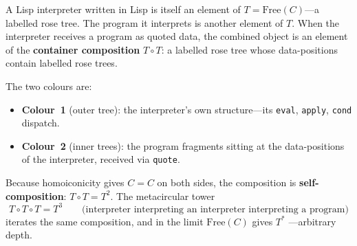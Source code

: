 \documentclass[11pt,a4paper]{article}
\theoremstyle{definition}
\theoremstyle{plain}
\newcommand{\Free}{\mathrm{Free}}
\begin{document}
A Lisp interpreter written in Lisp is itself an element of
$T = \Free(C)$---a labelled rose tree. The program it interprets is
another element of $T$. When the interpreter receives a program as
quoted data, the combined object is an element of the
\textbf{container composition} $T \circ T$: a labelled rose tree
whose data-positions contain labelled rose trees.

The two colours are:
\begin{itemize}[nosep]
\item \textbf{Colour~1} (outer tree): the interpreter's own
  structure---its \texttt{eval}, \texttt{apply}, \texttt{cond}
  dispatch.
\item \textbf{Colour~2} (inner trees): the program fragments sitting
  at the data-positions of the interpreter, received via \texttt{quote}.
\end{itemize}

\begin{center}
\end{center}

Because homoiconicity gives $C = C$ on both sides, the composition is
\textbf{self-composition}: $T \circ T = T^2$. The metacircular tower
\[
T \circ T \circ T = T^3
\qquad\text{(interpreter interpreting an interpreter interpreting a
  program)}
\]
iterates the same composition, and in the limit $\Free(C)$ gives $T^*$
---arbitrary depth.
\end{document}
